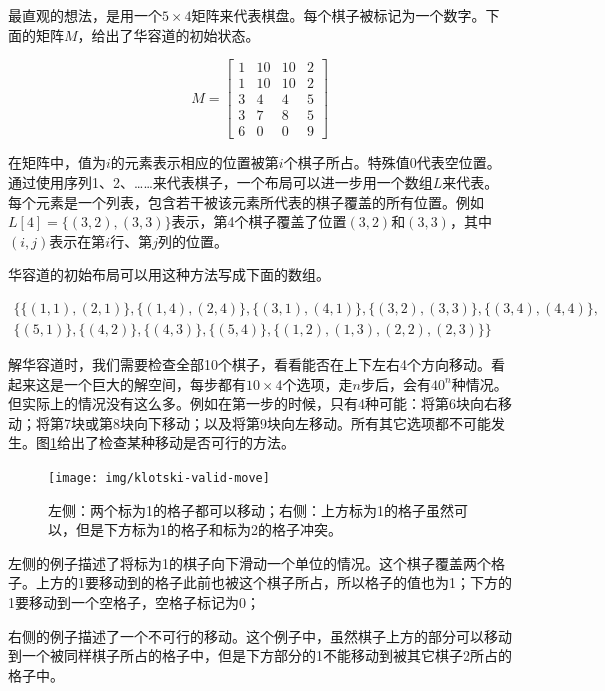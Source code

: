 \documentclass[b5paper]{ctexart}
\begin{document}
最直观的想法，是用一个$5 \times 4$矩阵来代表棋盘。每个棋子被标记为一个数字。下面的矩阵$M$，给出了华容道的初始状态。

\[
M = \left [
  \begin{array}{cccc}
  1 & 10 & 10 & 2 \\
  1 & 10 & 10 & 2 \\
  3 & 4 & 4 & 5 \\
  3 & 7 & 8 & 5 \\
  6 & 0 & 0 & 9
  \end{array}
\right ]
\]

在矩阵中，值为$i$的元素表示相应的位置被第$i$个棋子所占。特殊值0代表空位置。通过使用序列1、2、……来代表棋子，一个布局可以进一步用一个数组$L$来代表。每个元素是一个列表，包含若干被该元素所代表的棋子覆盖的所有位置。例如$L[4] = \{(3, 2), (3, 3)\}$表示，第4个棋子覆盖了位置$(3, 2)$和$(3, 3)$，其中$(i, j)$表示在第$i$行、第$j$列的位置。

华容道的初始布局可以用这种方法写成下面的数组。

\[
\begin{array}{l}
\{ \{(1, 1), (2, 1) \},
 \{(1, 4), (2, 4) \},
 \{(3, 1), (4, 1) \},
 \{(3, 2), (3, 3) \},
 \{(3, 4), (4, 4) \}, \\
 \{(5, 1) \},
 \{(4, 2) \},
 \{(4, 3) \},
 \{(5, 4) \},
 \{(1, 2), (1, 3), (2, 2), (2, 3) \} \}
\end{array}
\]

解华容道时，我们需要检查全部10个棋子，看看能否在上下左右4个方向移动。看起来这是一个巨大的解空间，每步都有$10 \times 4$个选项，走$n$步后，会有$40^n$种情况。但实际上的情况没有这么多。例如在第一步的时候，只有4种可能：将第6块向右移动；将第7块或第8块向下移动；以及将第9块向左移动。所有其它选项都不可能发生。图\ref{fig:klotski-valid-move}给出了检查某种移动是否可行的方法。

\begin{figure}[htbp]
 \centering
 \texttt{[image: img/klotski-valid-move]}
 \caption{左侧：两个标为1的格子都可以移动；右侧：上方标为1的格子虽然可以，但是下方标为1的格子和标为2的格子冲突。}
 \label{fig:klotski-valid-move}
\end{figure}

左侧的例子描述了将标为1的棋子向下滑动一个单位的情况。这个棋子覆盖两个格子。上方的1要移动到的格子此前也被这个棋子所占，所以格子的值也为1；下方的1要移动到一个空格子，空格子标记为0；

右侧的例子描述了一个不可行的移动。这个例子中，虽然棋子上方的部分可以移动到一个被同样棋子所占的格子中，但是下方部分的1不能移动到被其它棋子2所占的格子中。
\end{document}
